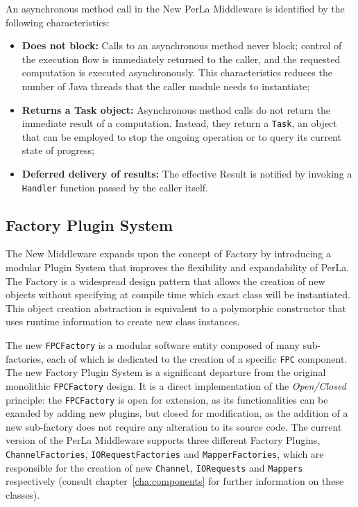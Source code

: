 An asynchronous method call in the New PerLa Middleware is identified by the
following characteristics:

\begin{itemize}

    \item \textbf{Does not block:} Calls to an asynchronous method never block;
        control of the execution flow is immediately returned to the caller,
        and the requested computation is executed asynchronously. This
        characteristics reduces the number of Java threads that the caller
        module needs to instantiate;

    \item \textbf{Returns a Task object:} Asynchronous method calls do not
        return the immediate result of a computation. Instead, they return a
        \texttt{Task}, an object that can be employed to stop the ongoing
        operation or to query its current state of progress;

    \item \textbf{Deferred delivery of results:} The effective Result is
        notified by invoking a \texttt{Handler} function passed by the caller
        itself.

\end{itemize}

\subsection{Factory Plugin System}
\label{sec:newmiddleware.factory}

The New Middleware expands upon the concept of Factory by introducing a modular
Plugin System that improves the flexibility and expandability of PerLa. The
Factory is a widespread design pattern that allows the creation of new objects
without specifying at compile time which exact class will be instantiated. This
object creation abstraction is equivalent to a polymorphic constructor that
uses runtime information to create new class instances.

The new \texttt{FPCFactory} is a modular software entity composed of many
sub-factories, each of which is dedicated to the creation of a specific
\texttt{FPC} component. The new Factory Plugin System is a significant
departure from the original monolithic \texttt{FPCFactory} design. It is a
direct implementation of the \textit{Open/Closed} principle: the
\texttt{FPCFactory} is open for extension, as its functionalities can be
exanded by adding new plugins, but closed for modification, as the addition of
a new sub-factory does not require any alteration to its source code. The
current version of the PerLa Middleware supports three different Factory
Plugins, \texttt{ChannelFactories}, \texttt{IORequestFactories} and
\texttt{MapperFactories}, which are responsible for the creation of new
\texttt{Channel}, \texttt{IORequests} and \texttt{Mappers} respectively
(consult chapter~\ref{cha:components} for further information on these
classes).
